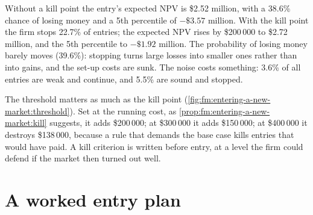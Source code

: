 Without a kill point the entry's expected NPV is \$2.52 million, with a 38.6\% chance of losing money and a 5th percentile of $-\$3.57$ million. With
the kill point the firm stops 22.7\% of entries; the expected NPV rises by \$200\,000 to \$2.72 million, and the 5th percentile to $-\$1.92$
million. The probability of losing money barely moves (39.6\%): stopping turns large losses into smaller ones rather than into gains, and the
set-up costs are sunk. The noise costs something: 3.6\% of all entries are weak and continue, and 5.5\% are sound and stopped.

\begin{omfigure}

\label{fig:fm:entering-a-new-market:threshold}
\end{omfigure}

The threshold matters as much as the kill point (\cref{fig:fm:entering-a-new-market:threshold}). Set at the running cost, as
\cref{prop:fm:entering-a-new-market:kill} suggests, it adds \$200\,000; at \$300\,000 it adds \$150\,000; at \$400\,000 it destroys \$138\,000,
because a rule that demands the base case kills entries that would have paid. A kill criterion is written before entry, at a level the firm could
defend if the market then turned out well.

\section{A worked entry plan}

